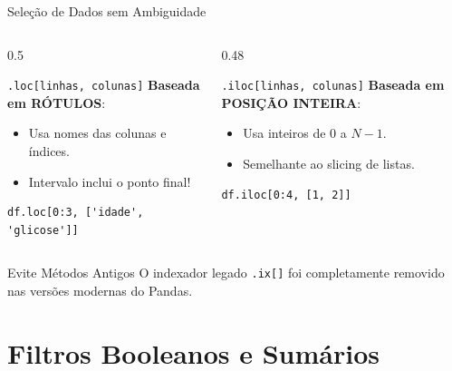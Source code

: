 \documentclass[aspectratio=169, 10pt]{beamer}
\begin{document}
\begin{frame}[fragile]{Seleção de Dados sem Ambiguidade}
  \begin{columns}
    \begin{column}{0.5\textwidth}
      \begin{block}{\texttt{.loc[linhas, colunas]}}
        \textbf{Baseada em RÓTULOS}:
        \begin{itemize}
          \item Usa nomes das colunas e índices.
          \item Intervalo inclui o ponto final!
        \end{itemize}
      \end{block}
      \begin{lstlisting}
df.loc[0:3, ['idade', 'glicose']]
      \end{lstlisting}
    \end{column}
    \begin{column}{0.48\textwidth}
      \begin{block}{\texttt{.iloc[linhas, colunas]}}
        \textbf{Baseada em POSIÇÃO INTEIRA}:
        \begin{itemize}
          \item Usa inteiros de 0 a $N-1$.
          \item Semelhante ao slicing de listas.
        \end{itemize}
      \end{block}
      \begin{lstlisting}
df.iloc[0:4, [1, 2]]
      \end{lstlisting}
    \end{column}
  \end{columns}
  \begin{alertblock}{Evite Métodos Antigos}
    O indexador legado \texttt{.ix[]} foi completamente removido nas versões modernas do Pandas.
  \end{alertblock}
\end{frame}

\section{Filtros Booleanos e Sumários}
\end{document}
